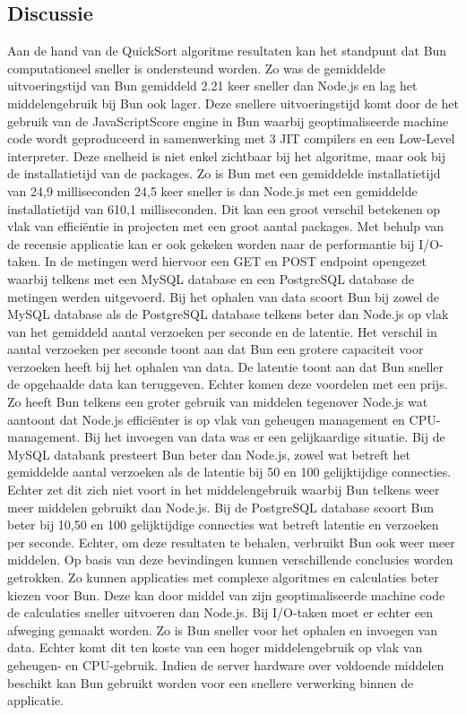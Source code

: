 \subsection{Discussie}
Aan de hand van de QuickSort algoritme resultaten kan het standpunt dat Bun computationeel sneller is ondersteund worden.
Zo was de gemiddelde uitvoeringstijd van Bun gemiddeld 2.21 keer sneller dan Node.js en lag het middelengebruik bij Bun ook lager. Deze snellere uitvoeringstijd komt door de
het gebruik van de JavaScriptScore engine in Bun waarbij geoptimaliseerde machine code wordt geproduceerd in 
samenwerking met 3 JIT compilers en een Low-Level interpreter.
Deze snelheid is niet enkel zichtbaar bij het algoritme, maar ook bij de installatietijd van de packages.
Zo is Bun met een gemiddelde installatietijd van 24,9 milliseconden 24,5 keer sneller is dan Node.js met een 
gemiddelde installatietijd van 610,1 milliseconden. Dit kan een groot verschil betekenen op vlak van efficiëntie in projecten 
met een groot aantal packages.
Met behulp van de recensie applicatie kan er ook gekeken worden naar de performantie bij I/O-taken.
In de metingen werd hiervoor een GET en POST endpoint opengezet waarbij telkens met een MySQL database en een PostgreSQL database de metingen werden uitgevoerd.
Bij het ophalen van data scoort Bun bij zowel de MySQL database als de PostgreSQL database telkens beter dan Node.js op vlak van het gemiddeld aantal verzoeken per seconde en de latentie.
Het verschil in aantal verzoeken per seconde toont aan dat Bun een grotere capaciteit voor verzoeken heeft bij het ophalen van data.
De latentie toont aan dat Bun sneller de opgehaalde data kan teruggeven. Echter komen deze voordelen met een prijs. 
Zo heeft Bun telkens een groter gebruik van middelen tegenover Node.js wat aantoont dat Node.js efficiënter is op vlak van geheugen management en CPU-management.
Bij het invoegen van data was er een gelijkaardige situatie. 
Bij de MySQL databank presteert Bun beter dan Node.js, zowel wat betreft het gemiddelde aantal verzoeken als de latentie 
bij 50 en 100 gelijktijdige connecties.
Echter zet dit zich niet voort in het middelengebruik waarbij Bun telkens weer meer middelen gebruikt dan Node.js.
Bij de PostgreSQL database scoort Bun beter bij 10,50 en 100 gelijktijdige connecties wat betreft latentie en verzoeken 
per seconde. Echter, om deze resultaten te behalen, verbruikt Bun ook weer meer middelen.
Op basis van deze bevindingen kunnen verschillende conclusies worden getrokken. 
Zo kunnen applicaties met complexe algoritmes en calculaties beter kiezen voor Bun. 
Deze kan door middel van zijn geoptimaliseerde machine code de calculaties sneller uitvoeren dan Node.js.
Bij I/O-taken moet er echter een afweging gemaakt worden. Zo is Bun sneller voor het ophalen en invoegen van data.
Echter komt dit ten koste van een hoger middelengebruik op vlak van geheugen- en CPU-gebruik. 
Indien de server hardware over voldoende middelen beschikt kan Bun gebruikt worden voor een snellere verwerking binnen de applicatie.

